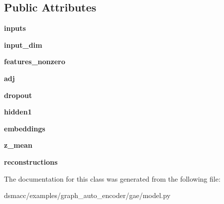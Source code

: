 \subsection*{Public Attributes}
\begin{DoxyCompactItemize}
\item 
\mbox{\label{classdsmacc_1_1examples_1_1graph__auto__encoder_1_1gae_1_1model_1_1GCNModelAE_acba23db16cd623e79a3629a08e32425e}} 
{\bfseries inputs}
\item 
\mbox{\label{classdsmacc_1_1examples_1_1graph__auto__encoder_1_1gae_1_1model_1_1GCNModelAE_a747949d01e1c5ad0f7aa9503f48e2a7d}} 
{\bfseries input\+\_\+dim}
\item 
\mbox{\label{classdsmacc_1_1examples_1_1graph__auto__encoder_1_1gae_1_1model_1_1GCNModelAE_a1a138af92cf662e4f1548dc970cada31}} 
{\bfseries features\+\_\+nonzero}
\item 
\mbox{\label{classdsmacc_1_1examples_1_1graph__auto__encoder_1_1gae_1_1model_1_1GCNModelAE_abeb02729569dbb16c651b7cb97d76ac1}} 
{\bfseries adj}
\item 
\mbox{\label{classdsmacc_1_1examples_1_1graph__auto__encoder_1_1gae_1_1model_1_1GCNModelAE_aef9d0980cf7e3de20c110895e1c65a24}} 
{\bfseries dropout}
\item 
\mbox{\label{classdsmacc_1_1examples_1_1graph__auto__encoder_1_1gae_1_1model_1_1GCNModelAE_a44aeeb456cc40f962efa175996006f4b}} 
{\bfseries hidden1}
\item 
\mbox{\label{classdsmacc_1_1examples_1_1graph__auto__encoder_1_1gae_1_1model_1_1GCNModelAE_a5c88053b4f564f65af0e372205c7efd9}} 
{\bfseries embeddings}
\item 
\mbox{\label{classdsmacc_1_1examples_1_1graph__auto__encoder_1_1gae_1_1model_1_1GCNModelAE_a975e79329c0195adb17f37b018871eef}} 
{\bfseries z\+\_\+mean}
\item 
\mbox{\label{classdsmacc_1_1examples_1_1graph__auto__encoder_1_1gae_1_1model_1_1GCNModelAE_abedef5455f5ad52fa8853e5ee33d814a}} 
{\bfseries reconstructions}
\end{DoxyCompactItemize}


The documentation for this class was generated from the following file\+:\begin{DoxyCompactItemize}
\item 
dsmacc/examples/graph\+\_\+auto\+\_\+encoder/gae/model.\+py\end{DoxyCompactItemize}
